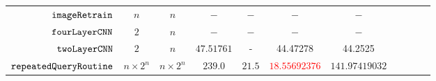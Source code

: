{\begin {table}[H]
\begin{center}
{\begin{tabular}{| >{\tiny}r | c | c | c | c | c | c | c | c | c | c  }
         {$\mathtt{imageRetrain}$} & $n$ &  $ n $ &   $ -  $  &  $-$ & $-$ & $-$ \\
         $ \mathtt{fourLayerCNN}$ & $2$ &  $ n $ &  $ -  $  &  $-$ & $-$ & $-$ \\
         $ \mathtt{twoLayerCNN}$ & $2$ &  $ n $ &  $47.51761$  &  - & 44.47278 & 44.2525  \\
         $  \mathtt{repeatedQueryRoutine}$ & $ n \times 2^n $ & $  n \times 2^n $ & $239.0$   & $21.5$ & \textcolor{red}{$18.55692376$} & $141.97419032$  \\
         \hline \hline
        \end{tabular}
}
\end{center}
\end{table}
}


